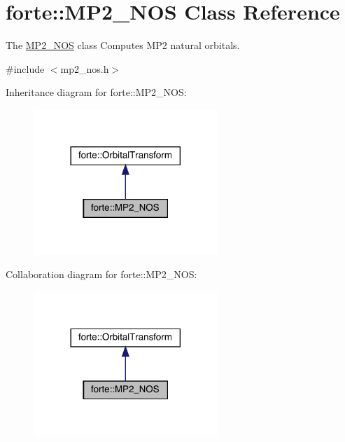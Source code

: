 \hypertarget{classforte_1_1_m_p2___n_o_s}{}\section{forte\+:\+:M\+P2\+\_\+\+N\+OS Class Reference}
\label{classforte_1_1_m_p2___n_o_s}


The \mbox{\hyperlink{classforte_1_1_m_p2___n_o_s}{M\+P2\+\_\+\+N\+OS}} class Computes M\+P2 natural orbitals.  




{\ttfamily \#include $<$mp2\+\_\+nos.\+h$>$}



Inheritance diagram for forte\+:\+:M\+P2\+\_\+\+N\+OS\+:
\nopagebreak
\begin{figure}[H]
\begin{center}
\leavevmode
\includegraphics[width=197pt]{classforte_1_1_m_p2___n_o_s__inherit__graph}
\end{center}
\end{figure}


Collaboration diagram for forte\+:\+:M\+P2\+\_\+\+N\+OS\+:
\nopagebreak
\begin{figure}[H]
\begin{center}
\leavevmode
\includegraphics[width=197pt]{classforte_1_1_m_p2___n_o_s__coll__graph}
\end{center}
\end{figure}
